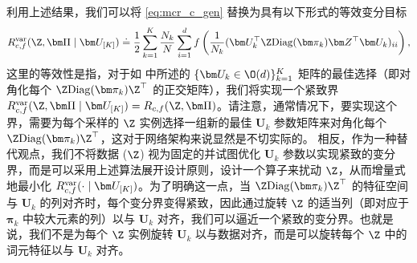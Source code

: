 \documentclass[../../book-main_zh.tex]{subfiles}
\begin{document}
利用上述结果，我们可以将 \eqref{eq:mcr_c_gen} 替换为具有以下形式的等效变分目标
\vspace{-2mm}
\begin{equation}
    \label{eq:var_comp}
    R^{\rm var}_{c,f} (\Z,\bm \Pi \mid \bm U_{[K]}) \doteq
    \frac{1}{2}\sum_{k=1}^K \frac{N_k}{N} \sum_{i=1}^{d}
    f\left(\frac{1}{N_k} (\bm U_{k}^{\top} \Z \mathrm{Diag}(\bm
    \pi_k) \bm Z^{\top} \bm U_{k})_{ii} \right),
\end{equation}
这里的等效性是指，对于如  中所述的 $\{ \bm U_k \in \O(d)\}_{k=1}^K$ 矩阵的最佳选择（即对角化每个 $\Z \mathrm{Diag}(\bm \pi_k) \Z^\top $ 的正交矩阵），我们将实现一个紧致界 $ R^{\rm var}_{c,f} (\Z,\bm \Pi \mid \bm U_{[K]}) =
R_{c,f} (\Z,\bm \Pi)$。请注意，通常情况下，要实现这个界，需要为每个采样的 $\Z$ 实例选择一组新的最佳 $\bm U_{k}$ 参数矩阵来对角化每个 $\Z\mathrm{Diag}(\bm \pi_{k})\Z^{\top}$，这对于网络架构来说显然是不切实际的。
相反，作为一种替代观点，我们不将数据 ($\Z$) 视为固定的并试图优化 $\bm U_k$ 参数以实现紧致的变分界，而是可以采用上述算法展开设计原则，设计一个算子来扰动 $\Z$，从而增量式地最小化 $R_{c, f}^{\rm
var}(\cdot \mid \bm U_{[K]})$。为了明确这一点，当 $\Z
\mathrm{Diag}(\bm \pi_k) \Z
^\top$ 的特征空间与 $\bm U_k$ 的列对齐时，每个变分界变得紧致，因此通过旋转 $\Z$ 的适当列（即对应于 $\bm \pi_k$ 中较大元素的列）以与 $\bm U_k$ 对齐，我们可以逼近一个紧致的变分界。也就是说，我们不是为每个 $\Z$ 实例旋转 $\bm U_k$ 以与数据对齐，而是可以旋转每个 $\Z$ 中的词元特征以与 $\bm U_k$ 对齐。
\end{document}

